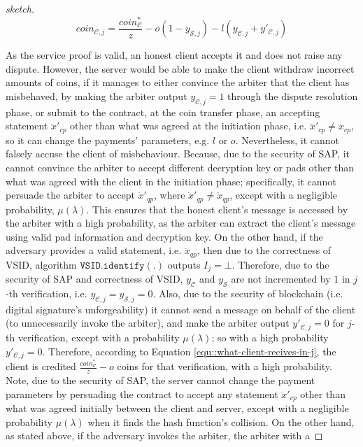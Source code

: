 \begin{proof}[sketch]
  \begin{equation}\label{equ::what-client-recives-in-j}
   coin_{\scriptscriptstyle\mathcal{C},j}=\frac{coin^{\scriptscriptstyle *}_{\scriptscriptstyle\mathcal C}}{z}-o(1-y_{\scriptscriptstyle\mathcal {S},j})-l(y_{\scriptscriptstyle\mathcal {C},j}+y'_{\scriptscriptstyle\mathcal {C},j})
     \end{equation}

    
As the service proof is valid, an honest client accepts it and does not raise any dispute. However, the server  would be able to make the client  withdraw incorrect amounts of coins, if it manages to either convince the arbiter that the client has misbehaved, by making the arbiter output  $y_{\scriptscriptstyle\mathcal {C},j}=1$ through the dispute resolution phase, or submit to the contract, at the coin transfer phase,  an accepting  statement $\ddot{x}'_{\scriptscriptstyle cp}$ other than what was agreed at the initiation phase, i.e. $\ddot{x}'_{\scriptscriptstyle cp}\neq\ddot{x}_{\scriptscriptstyle cp}$, so it can change the payments' parameters, e.g. $l$ or $o$. Nevertheless, it cannot falsely accuse the client of misbehaviour. Because,  due to the security of SAP, it cannot  convince the arbiter to accept different decryption key or pads other than what was agreed with the client in the initiation phase; specifically, it cannot persuade the arbiter to accept  $\ddot{x}'_{\scriptscriptstyle qp}$, where $\ddot{x}'_{\scriptscriptstyle qp}\neq \ddot{x}_{\scriptscriptstyle qp}$, except with a negligible probability, $\mu(\lambda)$. This ensures that the honest client's message is accessed by  the arbiter with a high probability, as the arbiter can extract the client's message using valid pad information and decryption key.  On the other hand, if the adversary provides a valid statement, i.e. $\ddot{x}_{\scriptscriptstyle qp}$, then due to the correctness of VSID, algorithm $\mathtt{VSID.identify}(.)$ outputs $I_{\scriptscriptstyle j}=\bot$. Therefore, due to the security of SAP and correctness of VSID,   $y_{\scriptscriptstyle\mathcal {C}}$ and $y_{\scriptscriptstyle\mathcal {S}}$ are not incremented by $1$  in $j$-th verification, i.e. $y_{\scriptscriptstyle\mathcal{C},j}=y_{\scriptscriptstyle\mathcal{S},j}=0$. Also, due to the security of blockchain (i.e. digital signature's  unforgeability) it cannot send a message on behalf of the client (to unnecessarily invoke the arbiter), and make  the arbiter output $y'_{\scriptscriptstyle\mathcal {C},j}=0$ for $j$-th verification, except with a probability $\mu(\lambda)$; so with a high probability $y'_{\scriptscriptstyle\mathcal {C},j}=0$. Therefore, according to Equation \ref{equ::what-client-recives-in-j}, the client is credited $\frac{coin_{\scriptscriptstyle\mathcal C}^{\scriptscriptstyle*}}{z}-o$ coins for that verification, with a high probability. Note,  due to the security of SAP, the server cannot change the payment parameters by persuading the contract to accept any statement $\ddot{x}'_{\scriptscriptstyle cp}$ other than what was agreed initially between the client and server, except with a negligible probability $\mu(\lambda)$ when it finds the hash function's collision. On the other hand, as stated above, if the adversary invokes the arbiter, the arbiter with a 
\end{proof}

